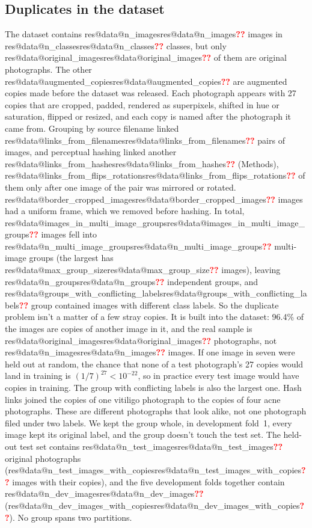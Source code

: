 \documentclass[11pt]{article}
\makeatletter
\newcommand{\res}[2]{\ifcsname res@#1@#2\endcsname\csname res@#1@#2\endcsname\else\textcolor{red}{\textbf{??}}\fi}
\makeatother
\begin{document}
\subsection*{Duplicates in the dataset}
The dataset contains \res{data}{n_images} images in \res{data}{n_classes} classes, but only \res{data}{original_images} of them are original photographs. The other \res{data}{augmented_copies} are augmented copies made before the dataset was released. Each photograph appears with 27 copies that are cropped, padded, rendered as superpixels, shifted in hue or saturation, flipped or resized, and each copy is named after the photograph it came from. Grouping by source filename linked \res{data}{links_from_filenames} pairs of images, and perceptual hashing linked another \res{data}{links_from_hashes} (Methods), \res{data}{links_from_flips_rotations} of them only after one image of the pair was mirrored or rotated. \res{data}{border_cropped_images} images had a uniform frame, which we removed before hashing. In total, \res{data}{images_in_multi_image_groups} images fell into \res{data}{n_multi_image_groups} multi-image groups (the largest has \res{data}{max_group_size} images), leaving \res{data}{n_groups} independent groups, and \res{data}{groups_with_conflicting_labels} group contained images with different class labels. So the duplicate problem isn't a matter of a few stray copies. It is built into the dataset: 96.4\% of the images are copies of another image in it, and the real sample is \res{data}{original_images} photographs, not \res{data}{n_images} images. If one image in seven were held out at random, the chance that none of a test photograph's 27 copies would land in training is $(1/7)^{27}<10^{-22}$, so in practice every test image would have copies in training. The group with conflicting labels is also the largest one. Hash links joined the copies of one vitiligo photograph to the copies of four acne photographs. These are different photographs that look alike, not one photograph filed under two labels. We kept the group whole, in development fold~1, every image kept its original label, and the group doesn't touch the test set. The held-out test set contains \res{data}{n_test_images} original photographs (\res{data}{n_test_images_with_copies} images with their copies), and the five development folds together contain \res{data}{n_dev_images} (\res{data}{n_dev_images_with_copies}). No group spans two partitions.
\end{document}
